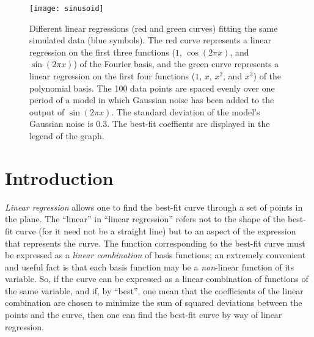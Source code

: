 \documentclass[twocolumn]{article}
\begin{document}
\thispagestyle{fancy}

%
%

\begin{figure}
   \begin{center}
      \texttt{[image: sinusoid]}
      \caption{%
         Different linear regressions (red and green curves) fitting the same
         simulated data (blue symbols).  The red curve represents a linear
         regression on the first three functions ($1$, $\cos(2\pi x)$, and
         $\sin(2\pi x)$) of the Fourier basis, and the green curve represents a
         linear regression on the first four functions ($1$, $x$, $x^2$, and
         $x^3$) of the polynomial basis.  The 100 data points are spaced evenly
         over one period of a model in which Gaussian noise has been added to
         the output of $\sin(2\pi x)$.  The standard deviation of the model's
         Gaussian noise is $0.3$.  The best-fit coeffients are displayed in the
         legend of the graph.%
      }
      \label{fig:sinusoid}
   \end{center}
\end{figure}

\section{Introduction}

\emph{Linear regression} allows one to find the best-fit curve through a set of
points in the plane. The ``linear'' in ``linear regression'' refers not to the
shape of the best-fit curve (for it need not be a straight line) but to an
aspect of the expression that represents the curve. The function corresponding
to the best-fit curve must be expressed as a \emph{linear combination} of basis
functions; an extremely convenient and useful fact is that each basis function
may be a \emph{non}-linear function of its variable.  So, if the curve can be
expressed as a linear combination of functions of the same variable, and if, by
``best'', one mean that the coefficients of the linear combination are chosen
to minimize the sum of squared deviations between the points and the curve,
then one can find the best-fit curve by way of linear regression.
\end{document}

